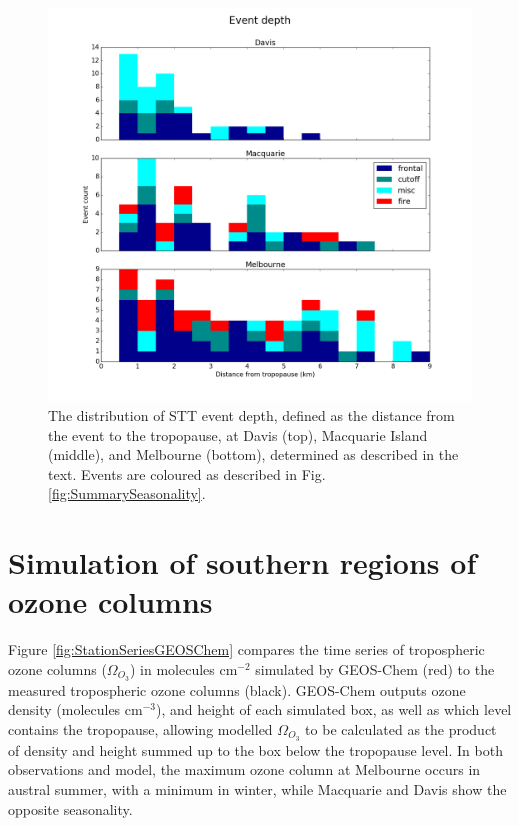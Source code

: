 \documentclass[acp, manuscript]{copernicus} %
\begin{document}
  \begin{figure}[t]
    \includegraphics[width=12cm]{figures/summary_depth.png}
    \caption{The distribution of STT event depth, defined as the distance from the event to the tropopause, at Davis (top), Macquarie Island (middle), and Melbourne (bottom), determined as described in the text.
    Events are coloured as described in Fig. \ref{fig:SummarySeasonality}.}
    \label{fig:SummaryTPDepths}    
  \end{figure}

\section{Simulation of southern regions of ozone columns}
  
  Figure \ref{fig:StationSeriesGEOSChem} compares the time series of tropospheric ozone columns ($\Omega_{O_3}$) in molecules cm$^{-2}$ simulated by GEOS-Chem (red) to the measured tropospheric ozone columns (black).
  GEOS-Chem outputs ozone density (molecules cm$^{-3}$), and height of each simulated box, as well as which level contains the tropopause, allowing modelled $\Omega_{O_3}$ to be calculated as the product of density and height summed up to the box below the tropopause level.
  In both observations and model, the maximum ozone column at Melbourne occurs in austral summer, with a minimum in winter, while Macquarie and Davis show the opposite seasonality.
  
\end{document}
